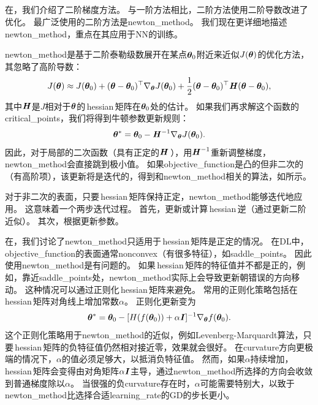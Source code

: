 
\subsection{}
\label{sec:newton_method}
在，我们介绍了二阶梯度方法。
与一阶方法相比，二阶方法使用二阶导数改进了优化。
最广泛使用的二阶方法是\gls{newton_method}。
我们现在更详细地描述\gls{newton_method}，重点在其应用于\gls{NN}的训练。

\gls{newton_method}是基于二阶泰勒级数展开在某点$\boldsymbol{\theta}_0$附近来近似$J(\boldsymbol{\theta})$的优化方法，其忽略了高阶导数：
\begin{equation}
    J(\boldsymbol{\theta}) \approx J(\boldsymbol{\theta}_0) + (\boldsymbol{\theta} - \boldsymbol{\theta}_0)^\top \nabla_{\boldsymbol{\theta}}   
    J(\boldsymbol{\theta}_0) + \frac{1}{2} (\boldsymbol{\theta} - \boldsymbol{\theta}_0)^\top \boldsymbol{\mathit{H}}(\boldsymbol{\theta} - \boldsymbol{\theta}_0),
\end{equation}
其中$\boldsymbol{\mathit{H}}$是$J$相对于$\boldsymbol{\theta}$的\,\gls{hessian}\,矩阵在$\boldsymbol{\theta}_0$处的估计。
如果我们再求解这个函数的\gls{critical_points}，我们将得到牛顿参数更新规则：
\begin{equation}
    \boldsymbol{\theta}^* = \boldsymbol{\theta}_0 - \boldsymbol{\mathit{H}}^{-1}\nabla_{\boldsymbol{\theta}} J(\boldsymbol{\theta}_0).
\label{eq:8.27}
\end{equation}
因此，对于局部的二次函数（具有正定的$\boldsymbol{\mathit{H}}$\,），用$\boldsymbol{\mathit{H}}^{-1}$重新调整梯度，\gls{newton_method}会直接跳到极小值。
如果\gls{objective_function}是凸的但非二次的（有高阶项），该更新将是迭代的，得到和\gls{newton_method}相关的算法，如所示。

对于非二次的表面，只要\,\gls{hessian}\,矩阵保持正定，\gls{newton_method}能够迭代地应用。
这意味着一个两步迭代过程。
首先，更新或计算\,\gls{hessian}\,逆（通过更新二阶近似）。
其次，根据更新参数。


在，我们讨论了\gls{newton_method}只适用于\,\gls{hessian}\,矩阵是正定的情况。
在\gls{DL}中，\gls{objective_function}的表面通常\gls{nonconvex}（有很多特征），如\gls{saddle_points}。
因此使用\gls{newton_method}是有问题的。
如果\,\gls{hessian}\,矩阵的特征值并不都是正的，例如，靠近\gls{saddle_points}处，\gls{newton_method}实际上会导致更新朝错误的方向移动。
这种情况可以通过正则化\,\gls{hessian}\,矩阵来避免。
常用的正则化策略包括在\,\gls{hessian}\,矩阵对角线上增加常数$\alpha$。
正则化更新变为
\begin{equation}
    \boldsymbol{\theta}^* = \boldsymbol{\theta}_0 - [ H( f(\boldsymbol{\theta}_0)) + \alpha \boldsymbol{\mathit{I}}  ]^{-1} \nabla_{\boldsymbol{\theta}} f(\boldsymbol{\theta}_0).
\end{equation}
这个正则化策略用于\gls{newton_method}的近似，例如Levenberg-Marquardt算法\citep{Levenberg44,Marquardt63}，只要\,\gls{hessian}\,矩阵的负特征值仍然相对接近零，效果就会很好。
在\gls{curvature}方向更极端的情况下，$\alpha$的值必须足够大，以抵消负特征值。
然而，如果$\alpha$持续增加，\gls{hessian}\,矩阵会变得由对角矩阵$\alpha \boldsymbol{\mathit{I}}$主导，通过\gls{newton_method}所选择的方向会收敛到普通梯度除以$\alpha$。
当很强的负\gls{curvature}存在时，$\alpha$可能需要特别大，以致于\gls{newton_method}比选择合适\gls{learning_rate}的\gls{GD}的步长更小。

